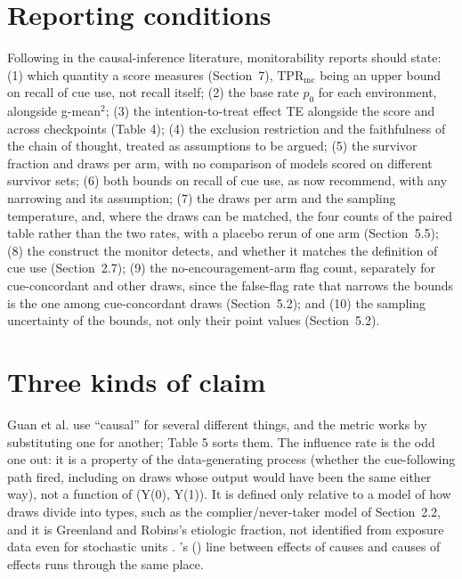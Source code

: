 \documentclass[11pt]{article}
\begin{document}
\section{Reporting conditions}
Following \citet{cook2008three} in the causal-inference literature, monitorability reports should state: (1) which quantity a score measures (Section~7), $\mathrm{TPR}_{\mathrm{mc}}$ being an upper bound on recall of cue use, not recall itself; (2) the base rate $p_0$ for each environment, alongside g-mean$^2$; (3) the intention-to-treat effect TE alongside the score and across checkpoints (Table 4); (4) the exclusion restriction and the faithfulness of the chain of thought, treated as assumptions to be argued; (5) the survivor fraction and draws per arm, with no comparison of models scored on different survivor sets; (6) both bounds on recall of cue use, as \citet*{guan2026beyond} now recommend, with any narrowing and its assumption; (7) the draws per arm and the sampling temperature, and, where the draws can be matched, the four counts of the paired table rather than the two rates, with a placebo rerun of one arm (Section~5.5); (8) the construct the monitor detects, and whether it matches the definition of cue use (Section~2.7); (9) the no-encouragement-arm flag count, separately for cue-concordant and other draws, since the false-flag rate that narrows the bounds is the one among cue-concordant draws (Section~5.2); and (10) the sampling uncertainty of the bounds, not only their point values (Section~5.2).

\section{Three kinds of claim}
Guan et al. use “causal” for several different things, and the metric works by substituting one for another; Table 5 sorts them. The influence rate is the odd one out: it is a property of the data-generating process (whether the cue-following path fired, including on draws whose output would have been the same either way), not a function of (Y(0), Y(1)). It is defined only relative to a model of how draws divide into types, such as the complier/never-taker model of Section~2.2, and it is Greenland and Robins’s etiologic fraction, not identified from exposure data even for stochastic units \citep{robins1989probability}. \citeauthor{holland1986statistics}’s (\citeyear{holland1986statistics}) line between effects of causes and causes of effects runs through the same place.
\end{document}
